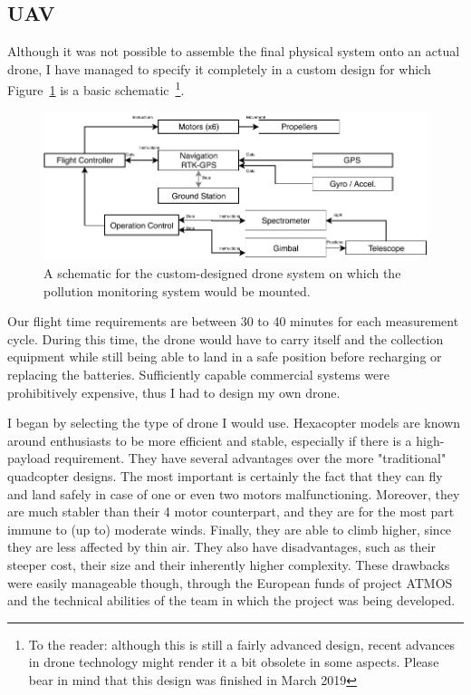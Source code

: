 \subsection{\acrlong{UAV}}%
\label{sub:methods_uav}

Although it was not possible to assemble the final physical system onto
an actual drone, I have managed to specify it completely in a custom
design for which Figure~\ref{fig:img/pdf/drone_schematic} is a basic
schematic~\footnote{To the reader: although this is still a fairly
advanced design, recent advances in drone technology might render it
a bit obsolete in some aspects. Please bear in mind that this design
was finished in March 2019}.

\begin{figure}[htpb]
    \centering
    \includegraphics[width=0.8\linewidth]{img/pdf/drone.pdf}
    \caption{A schematic for the custom-designed drone system on which
    the pollution monitoring system would be mounted.}%
    \label{fig:img/pdf/drone_schematic}
\end{figure}

Our flight time requirements are between 30 to 40 minutes for each
measurement cycle. During this time, the drone would have to carry
itself and the collection equipment while still being able to land in a
safe position before recharging or replacing the batteries. Sufficiently
capable commercial systems were prohibitively expensive, thus I had to
design my own drone.

I began by selecting the type of drone I would use. Hexacopter models
are known around enthusiasts to be more efficient and stable, especially
if there is a high-payload requirement. They have several advantages
over the more "traditional" quadcopter designs. The most important is
certainly the fact that they can fly and land safely in case of one or
even two motors malfunctioning. Moreover, they are much stabler than
their 4 motor counterpart, and they are for the most part immune to (up
to) moderate winds. Finally, they are able to climb higher, since they
are less affected by thin air. They also have disadvantages, such as
their steeper cost, their size and their inherently higher complexity.
These drawbacks were easily manageable though, through the European
funds of project \gls{ATMOS} and the technical abilities of the team in
which the project was being developed.

